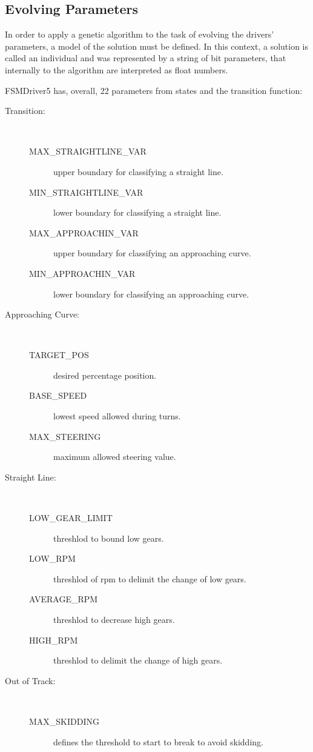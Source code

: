 \subsection{Evolving Parameters}%
In order to apply a genetic algorithm to the task of evolving the drivers' parameters, a model of the solution must be defined. In this context, a solution is called an individual and was represented by a string of bit parameters, that internally to the algorithm are interpreted as float numbers.

FSMDriver5 has, overall, 22 parameters from states and the transition function:

\begin{description}
	\item[Transition:] \ %
	\begin{description}
		\item[MAX\_STRAIGHTLINE\_VAR] upper boundary for classifying a straight line.
		\item[MIN\_STRAIGHTLINE\_VAR] lower boundary for classifying a straight line.
		\item[MAX\_APPROACHIN\_VAR] upper boundary for classifying an approaching curve.
		\item[MIN\_APPROACHIN\_VAR] lower boundary for classifying an approaching curve.
	\end{description}
	\item[Approaching Curve:] \ %
	\begin{description}
		\item[TARGET\_POS] desired percentage position.
		\item[BASE\_SPEED] lowest speed allowed during turns.
		\item[MAX\_STEERING] maximum allowed steering value.
	\end{description}
	\item[Straight Line:] \ %
	\begin{description}
		\item[LOW\_GEAR\_LIMIT] threshlod to bound low gears.
		\item[LOW\_RPM] threshlod of rpm to delimit the change of low gears.
		\item[AVERAGE\_RPM] threshlod to decrease high gears.
		\item[HIGH\_RPM] threshlod to delimit the change of high gears.
	\end{description}
	\item[Out of Track:] \ %
	\begin{description}
		\item[MAX\_SKIDDING] defines the threshold to start to break to avoid skidding.

\end{description}
\end{description}
